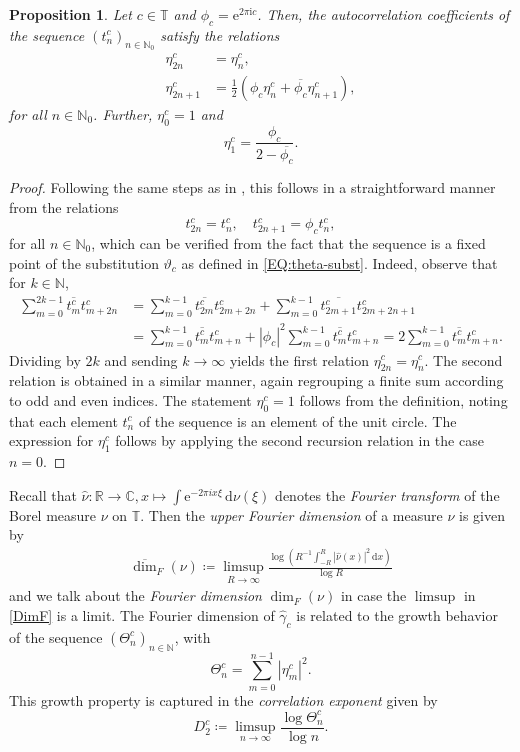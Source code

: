 \documentclass[11pt,reqno]{amsart}
\theoremstyle{plain}
\newtheorem{prop}[theorem]{Proposition}
\theoremstyle{definition}
\newcommand{\R}{{\mathbb R}}
\newcommand{\N}{{\mathbb N}}
\newcommand{\C}{{\mathbb C}}
\newcommand{\T}{{\mathbb T}}
\newcommand{\im}{{\mathrm{i}}}
\newcommand{\me}{\mathrm{e}}
\newcommand{\dd}{\,\mathrm{d}}
\renewcommand{\hat}{\widehat}
\begin{document}
\begin{prop}
\label{PROP:eta-recursion}
Let $c\in \T$ and $\phi_c = \me^{2 \pi \im c}$. Then, the autocorrelation coefficients of the sequence $(t_n^c)_{n \in \N_0}$ satisfy the relations
\begin{align*}
\eta_{2n}^{c} & = \eta_n^{c},
\\ \eta_{2n+1}^{c} & = \frac{1}{2}(\phi_{c} \eta_n^{c} + \overline{\phi_{c}} \eta_{n+1}^{c}),
\end{align*}
for all $n \in \N_0$. Further, $\eta_0^{c} = 1$ and 
\[
\eta_1^{c} = \frac{\phi_{c}}{2 - \overline{\phi_{c}}}.
\]
\end{prop}


\begin{proof}
Following the same steps as in \cite[Ch.~10]{baake}, this follows in a straightforward manner from the relations 
\[
t_{2n}^c = t_n^{c}, \quad t_{2n+1}^c = \phi_{c} t_n^c,
\]
for all $n \in \N_0$, which can be verified from the fact that the sequence is a fixed point of the substitution $\vartheta_{c}$ as defined in \eqref{EQ:theta-subst}. Indeed, observe that for $k \in \N$,
\begin{align*}
\sum_{m=0}^{2k-1} \overline{t^c_{m}} t_{m+2n}^c
& = \sum_{m=0}^{k-1} \overline{t^c_{2m}} t_{2m + 2n}^c + 
\sum_{m=0}^{k-1} \overline{t^c_{2m+1}} t_{2m + 2n + 1}^c
\\ &= \sum_{m=0}^{k-1} \overline{t^c_m} t^c_{m+n} 
+ |\phi_{c}|^2 \sum_{m=0}^{k-1} \overline{t^c_m} t^c_{m+n}
= 2 \sum_{m=0}^{k-1} \overline{t^c_m} t^c_{m+n}.
\end{align*}
Dividing by $2k$ and sending $k \to \infty$ yields the first relation $\eta_{2n}^{c} = \eta_n^{c}$. The second relation is obtained in a similar manner, again regrouping a finite sum according to odd and even indices. The statement $\eta_0^{c} = 1$ follows from the definition, noting that each element $t_n^c$ of the sequence is an element of the unit circle. The expression for $\eta_1^{c}$ follows by applying the second recursion relation in the case $n = 0$.
\end{proof}
Recall that $\hat \nu:\R\to \C, x\mapsto \int \me^{-2\pi i x \xi  }\dd \nu(\xi)  $ denotes the {\em Fourier transform} of the Borel measure $\nu$ on $\T$. Then the {\em upper Fourier dimension} of a measure $\nu$ is given by
\begin{eqnarray}\label{DimF}
\overline{\dim}_{F}(\nu)\coloneqq \limsup_{R\to \infty} \frac{\log \left(R^{-1}\int_{-R}^{R}|\hat \nu (x)|^{2}\dd x\right)}{\log R}
\end{eqnarray}
and we talk about the {\em Fourier dimension} $\dim_{F}(\nu)$ in case the $\limsup$ in \eqref{DimF} is a limit.
The Fourier dimension of  $\widehat{\gamma}_{c}$  is related to the growth behavior of the sequence $(\Theta_n^c)_{n \in \N}$, with
\[
\Theta_n^c = \sum_{m = 0}^{n-1} |\eta_m^c|^2.
\]
This growth property is captured in the \emph{correlation exponent} given by
\begin{equation}
D_{2}^{c} \coloneqq \limsup_{n \to \infty} \frac{\log \Theta_n^{c}}{\log n}.\label{eq: def corr expo}
\end{equation}
\end{document}
